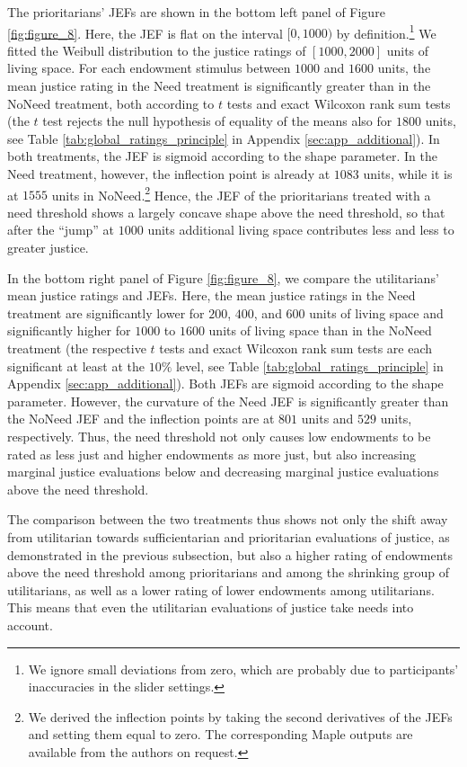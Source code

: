 \documentclass[12pt]{scrartcl}
\begin{document}
The prioritarians' JEFs are shown in the bottom left panel of Figure \ref{fig:figure_8}.
Here, the JEF is flat on the interval $[0,1000)$ by definition.\footnote{We ignore small deviations from zero, which are probably due to participants' inaccuracies in the slider settings.}
We fitted the Weibull distribution to the justice ratings of $[1000,2000]$ units of living space.
For each endowment stimulus between $1000$ and $1600$ units, the mean justice rating in the Need treatment is significantly greater than in the NoNeed treatment, both according to $t$ tests and exact Wilcoxon rank sum tests (the $t$ test rejects the null hypothesis of equality of the means also for $1800$ units, see Table \ref{tab:global_ratings_principle} in Appendix \ref{sec:app_additional}).
In both treatments, the JEF is sigmoid according to the shape parameter.
In the Need treatment, however, the inflection point is already at $1083$ units, while it is at $1555$ units in NoNeed.\footnote{We derived the inflection points by taking the second derivatives of the JEFs and setting them equal to zero. The corresponding Maple outputs are available from the authors on request.}
Hence, the JEF of the prioritarians treated with a need threshold shows a largely concave shape above the need threshold, so that after the ``jump'' at $1000$ units additional living space contributes less and less to greater justice.

In the bottom right panel of Figure \ref{fig:figure_8}, we compare the utilitarians' mean justice ratings and JEFs.
Here, the mean justice ratings in the Need treatment are significantly lower for $200$, $400$, and $600$ units of living space and significantly higher for $1000$ to $1600$ units of living space than in the NoNeed treatment (the respective $t$ tests and exact Wilcoxon rank sum tests are each significant at least at the $10\%$ level, see Table \ref{tab:global_ratings_principle} in Appendix \ref{sec:app_additional}).
Both JEFs are sigmoid according to the shape parameter.
However, the curvature of the Need JEF is significantly greater than the NoNeed JEF and the inflection points are at $801$ units and $529$ units, respectively.
Thus, the need threshold not only causes low endowments to be rated as less just and higher endowments as more just, but also increasing marginal justice evaluations below and decreasing marginal justice evaluations above the need threshold.

The comparison between the two treatments thus shows not only the shift away from utilitarian towards sufficientarian and prioritarian evaluations of justice, as demonstrated in the previous subsection, but also a higher rating of endowments above the need threshold among prioritarians and among the shrinking group of utilitarians, as well as a lower rating of lower endowments among utilitarians.
This means that even the utilitarian evaluations of justice take needs into account.
\end{document}
